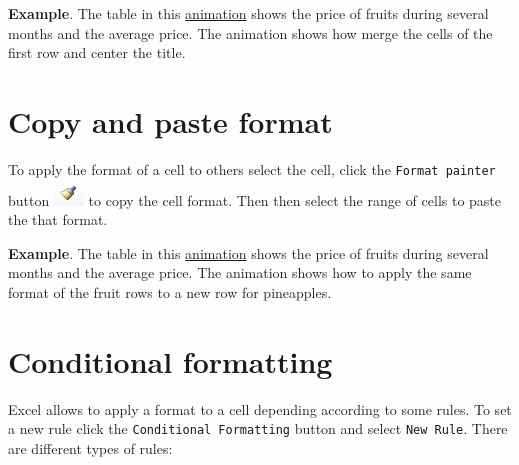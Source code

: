 \textbf{Example}. The table in this \href{http://aprendeconalf.es/office/excel/manual/img/example_merge_cells.gif}{animation} shows the price of fruits during several months and the average price. The animation shows how merge the cells of the first row and center the title.

\section{Copy and paste format}\hypertarget{copy-and-paste-format}{}\label{copy-and-paste-format}

To apply the format of a cell to others select the cell, click the \texttt{Format painter} button 
\includegraphics[scale=0.7]{../img/button_format_painter.png} to copy the cell format. Then then select the range of
cells to paste the that format.

\textbf{Example}. The table in this \href{http://aprendeconalf.es/office/excel/manual/img/example_format_painter.gif}{animation} shows the price of fruits during several months and the average price. The animation shows how to apply the same format of the fruit rows to a new row for pineapples.

\section{Conditional formatting}\hypertarget{conditional-formatting}{}\label{conditional-formatting}

Excel allows to apply a format to a cell depending according to some rules. To set a new rule click the \texttt{Conditional Formatting} button and select \texttt{New Rule}. There are different types of rules:


